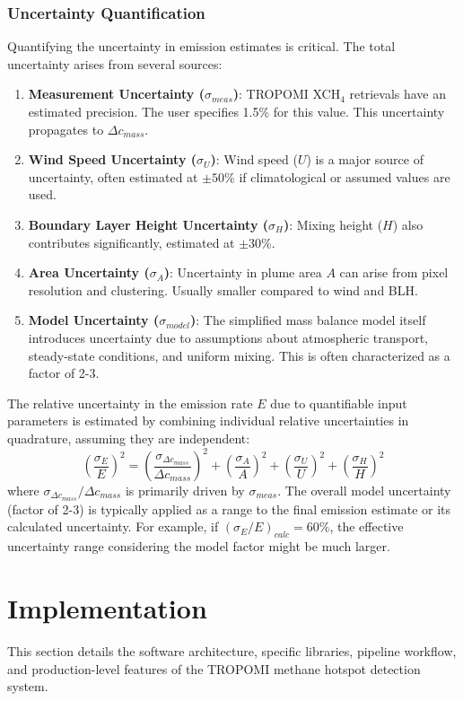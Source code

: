 \documentclass[12pt,a4paper]{article}
\begin{document}
\subsubsection{Uncertainty Quantification}
Quantifying the uncertainty in emission estimates is critical. The total uncertainty arises from several sources:
\begin{enumerate}
    \item \textbf{Measurement Uncertainty ($\sigma_{meas}$)}: TROPOMI XCH$_4$ retrievals have an estimated precision. The user specifies 1.5\% for this value. This uncertainty propagates to $\Delta c_{mass}$.
    \item \textbf{Wind Speed Uncertainty ($\sigma_U$)}: Wind speed ($U$) is a major source of uncertainty, often estimated at $\pm 50\%$ if climatological or assumed values are used.
    \item \textbf{Boundary Layer Height Uncertainty ($\sigma_H$)}: Mixing height ($H$) also contributes significantly, estimated at $\pm 30\%$.
    \item \textbf{Area Uncertainty ($\sigma_A$)}: Uncertainty in plume area $A$ can arise from pixel resolution and clustering. Usually smaller compared to wind and BLH.
    \item \textbf{Model Uncertainty ($\sigma_{model}$)}: The simplified mass balance model itself introduces uncertainty due to assumptions about atmospheric transport, steady-state conditions, and uniform mixing. This is often characterized as a factor of 2-3.
\end{enumerate}

The relative uncertainty in the emission rate $E$ due to quantifiable input parameters is estimated by combining individual relative uncertainties in quadrature, assuming they are independent:
\begin{equation}
    \left(\frac{\sigma_E}{E}\right)^2 = \left(\frac{\sigma_{\Delta c_{mass}}}{\Delta c_{mass}}\right)^2 + \left(\frac{\sigma_A}{A}\right)^2 + \left(\frac{\sigma_U}{U}\right)^2 + \left(\frac{\sigma_H}{H}\right)^2
    \label{eq:uncertainty_prop}
\end{equation}
where $\sigma_{\Delta c_{mass}} / \Delta c_{mass}$ is primarily driven by $\sigma_{meas}$. The overall model uncertainty (factor of 2-3) is typically applied as a range to the final emission estimate or its calculated uncertainty. For example, if $(\sigma_E/E)_{calc} = 60\%$, the effective uncertainty range considering the model factor might be much larger.

\section{Implementation}
\label{sec:implementation}
This section details the software architecture, specific libraries, pipeline workflow, and production-level features of the TROPOMI methane hotspot detection system.
\end{document}
